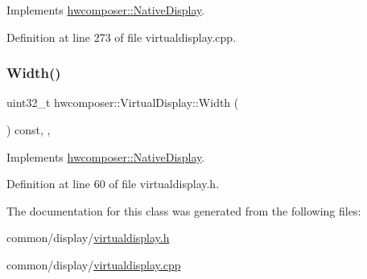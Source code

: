 Implements \mbox{\hyperlink{classhwcomposer_1_1NativeDisplay_a6817e88bc9def8ae1ae8088922803dc1}{hwcomposer\+::\+Native\+Display}}.



Definition at line 273 of file virtualdisplay.\+cpp.


\begin{DoxyCode}{0}
\end{DoxyCode}
\mbox{\label{classhwcomposer_1_1VirtualDisplay_ac860da388ef586d62f6864612db7fa2d}} 
\subsubsection{\texorpdfstring{Width()}{Width()}}
{\footnotesize\ttfamily uint32\+\_\+t hwcomposer\+::\+Virtual\+Display\+::\+Width (\begin{DoxyParamCaption}{ }\end{DoxyParamCaption}) const\hspace{0.3cm}{\ttfamily [inline]}, {\ttfamily [override]}, {\ttfamily [virtual]}}



Implements \mbox{\hyperlink{classhwcomposer_1_1NativeDisplay_a9a18c3dfba567c86c088b06febda4019}{hwcomposer\+::\+Native\+Display}}.



Definition at line 60 of file virtualdisplay.\+h.


\begin{DoxyCode}{0}
\end{DoxyCode}


The documentation for this class was generated from the following files\+:\begin{DoxyCompactItemize}
\item 
common/display/\mbox{\hyperlink{virtualdisplay_8h}{virtualdisplay.\+h}}\item 
common/display/\mbox{\hyperlink{virtualdisplay_8cpp}{virtualdisplay.\+cpp}}\end{DoxyCompactItemize}
